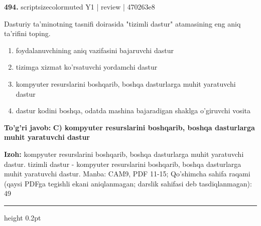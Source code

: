 \documentclass[10pt,a4paper]{article}
\begin{document}
{\bfseries\sffamily\color{ink} 494.} {scriptsizecolor{muted} Y1 | review | 470263e8}
\par
Dasturiy ta'minotning tasnifi doirasida "tizimli dastur" atamasining eng aniq ta'rifini toping.
\begin{enumerate}[label=\Alph*),leftmargin=9mm]
\item foydalanuvchining aniq vazifasini bajaruvchi dastur
\item tizimga xizmat ko'rsatuvchi yordamchi dastur
\item kompyuter resurslarini boshqarib, boshqa dasturlarga muhit yaratuvchi dastur
\item dastur kodini boshqa, odatda mashina bajaradigan shaklga o'giruvchi vosita
\end{enumerate}
\begin{tcolorbox}[enhanced,breakable,colback=teal!4,colframe=teal!60!black,boxrule=0.45pt,arc=1.2mm,left=2.7mm,right=2.7mm,top=1.8mm,bottom=1.8mm,before skip=2mm,after skip=2mm]
{\bfseries\sffamily\color{teal}To'g'ri javob:} \textbf{C) kompyuter resurslarini boshqarib, boshqa dasturlarga muhit yaratuvchi dastur}
\par\smallskip
{\bfseries Izoh:} kompyuter resurslarini boshqarib, boshqa dasturlarga muhit yaratuvchi dastur. tizimli dastur - kompyuter resurslarini boshqarib, boshqa dasturlarga muhit yaratuvchi dastur. Manba: CAM9, PDF 11-15; Qo'shimcha sahifa raqami (qaysi PDFga tegishli ekani aniqlanmagan; darslik sahifasi deb tasdiqlanmagan): 49
\end{tcolorbox}
\vspace{2mm}\hrule height 0.2pt\vspace{3mm}
\end{document}
